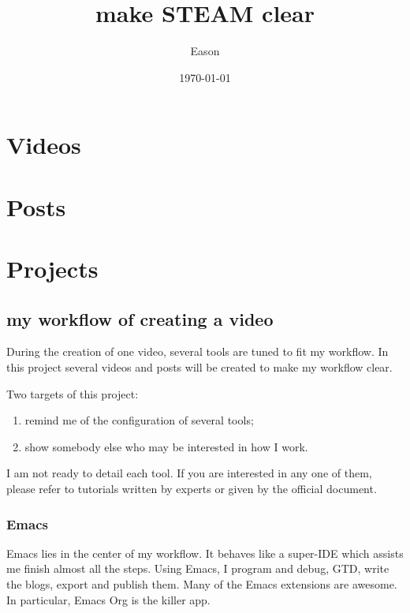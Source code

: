 \documentclass[koma,a4paper,utopia,10pt,listings-color,microtype,paralist,colorlinks]{org-article}
\author{Eason}
\date{\today}
\title{make STEAM clear}
\begin{document}
\maketitle
\tableofcontents



\section{Videos}
\label{sec:org23819b1}



\section{Posts}
\label{sec:orgb1ab608}


\section{Projects}
\label{sec:orge8d1fc9}


\subsection{my workflow of creating a video}
\label{sec:org8223223}
During the creation of one video, several tools are tuned to fit my workflow. In
this project several videos and posts will be created to make my workflow clear.

Two targets of this project:
\begin{enumerate}
\item remind me of the configuration of several tools;
\item show somebody else who may be interested in how I work.
\end{enumerate}

I am not ready to detail each tool. If you are interested in any one of them,
please refer to tutorials written by experts or given by the official document.

\subsubsection{Emacs}
\label{sec:orgc041d09}


Emacs lies in the center of my workflow. It behaves like a super-IDE which
assists me finish almost all the steps. Using Emacs, I program and debug, GTD,
write the blogs, export and publish them. Many of the Emacs extensions are
awesome. In particular, Emacs Org is the killer app.
\end{document}
